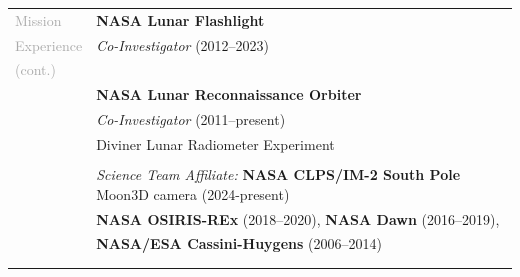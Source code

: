 \documentclass[letterpaper,10pt,twoside]{article}
\begin{document}
\newpage
\vspace{0.05in}
\noindent \begin{tabular}{@{} l l}
\large{\textcolor{darkgray}{Mission}} & \textbf{NASA Lunar Flashlight}  \\
\large{\textcolor{darkgray}{Experience}} & \textit{Co-Investigator} (2012--2023)\\ 
\large{\textcolor{darkgray}{(cont.)}} & \\
     & \textbf{NASA Lunar Reconnaissance Orbiter} \\
     & \textit{Co-Investigator} (2011--present) \\
     & Diviner Lunar Radiometer Experiment \\ 
     & \\
     & \textit{Science Team Affiliate:} \textbf{NASA CLPS/IM-2 South Pole} Moon3D camera (2024-present)\\
     & \textbf{NASA OSIRIS-REx} (2018--2020), \textbf{NASA Dawn} (2016--2019),\\
     & \textbf{NASA/ESA Cassini-Huygens} (2006--2014)\\
     & \\
     & \\


\end{tabular}
\end{document}
